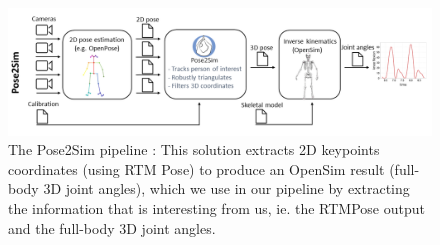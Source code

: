 \documentclass{amsart}
\theoremstyle{definition}
\theoremstyle{plain}
\begin{document}
\begin{figure}
  \includegraphics[width = 0.99 \columnwidth]{img/pose2sim_pipeline.png}
  \caption{The Pose2Sim pipeline : This solution extracts 2D keypoints coordinates (using RTM Pose\cite{RTMPose}) to produce an OpenSim result (full-body 3D joint angles), which we use in our pipeline by extracting the information that is interesting from us, ie. the RTMPose output and the full-body 3D joint angles.}
  \label{fig:pose2sim_pipeline}
\end{figure}
\end{document}
